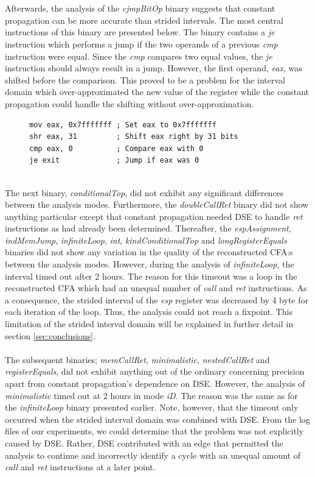 \documentclass{kththesis}
\renewcommand{\it}[1]{\textit{#1}}
\begin{document}
\\ \\
Afterwards, the analysis of the \it{cjmpBitOp} binary suggests that constant propagation can be more accurate than strided intervals. The most central instructions of this binary are presented below. The binary contains a \it{je} instruction which performs a jump if the two operands of a previous \it{cmp} instruction were equal. Since the \it{cmp} compares two equal values, the \it{je} instruction should always result in a jump. However, the first operand, \it{eax}, was shifted before the comparison. This proved to be a problem for the interval domain which over-approximated the new value of the register while the constant propagation could handle the shifting without over-approximation.
\begin{figure}[!ht]
    \centering
\begin{tcolorbox}
\begin{verbatim}
mov eax, 0x7fffffff ; Set eax to 0x7fffffff
shr eax, 31         ; Shift eax right by 31 bits 
cmp eax, 0          ; Compare eax with 0
je exit             ; Jump if eax was 0
\end{verbatim}
\end{tcolorbox}
\end{figure}
\\
The next binary, \it{conditionalTop}, did not exhibit any significant differences between the analysis modes. Furthermore, the \it{doubleCallRet} binary did not show anything particular except that constant propagation needed DSE to handle \it{ret} instructions as had already been determined. Thereafter, the \it{espAssignment}, \it{indMemJump}, \it{infiniteLoop}, \it{int}, \it{kindConditionalTop} and \it{longRegisterEquals} binaries did not show any variation in the quality of the reconstructed CFA:s between the analysis modes. However, during the analysis of \it{infiniteLoop}, the interval timed out after 2 hours. The reason for this timeout was a loop in the reconstructed CFA which had an unequal number of \it{call} and \it{ret} instructions. As a consequence, the strided interval of the \it{esp} register was decreased by 4 byte for each iteration of the loop. Thus, the analysis could not reach a fixpoint. This limitation of the strided interval domain will be explained in further detail in section \ref{sec:conclusions}.
\\ \\ 
The subsequent binaries; \it{memCallRet}, \it{minimalistic}, \it{nestedCallRet} and \it{registerEquals}, did not exhibit anything out of the ordinary concerning precision apart from constant propagation's dependence on DSE. However, the analysis of \it{minimalistic} timed out at 2 hours in mode \it{iD}. The reason was the same as for the \it{infiniteLoop} binary presented earlier. Note, however, that the timeout only occurred when the strided interval domain was combined with DSE. From the log files of our experiments, we could determine that the problem was not explicitly caused by DSE. Rather, DSE contributed with an edge that permitted the analysis to continue and incorrectly identify a cycle with an unequal amount of \it{call} and \it{ret} instructions at a later point. 
\end{document}
